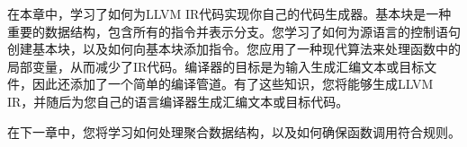 在本章中，学习了如何为LLVM IR代码实现你自己的代码生成器。基本块是一种重要的数据结构，包含所有的指令并表示分支。您学习了如何为源语言的控制语句创建基本块，以及如何向基本块添加指令。您应用了一种现代算法来处理函数中的局部变量，从而减少了IR代码。编译器的目标是为输入生成汇编文本或目标文件，因此还添加了一个简单的编译管道。有了这些知识，您将能够生成LLVM IR，并随后为您自己的语言编译器生成汇编文本或目标代码。\par

在下一章中，您将学习如何处理聚合数据结构，以及如何确保函数调用符合规则。\par

\newpage